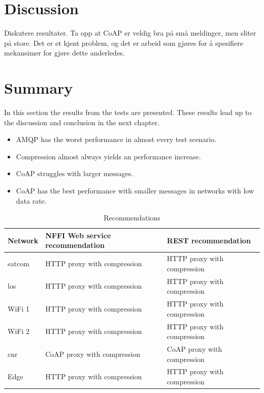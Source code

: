 \section{Discussion}

Diskutere resultater. Ta opp at CoAP er veldig bra på små meldinger, men sliter
på store. Det er et kjent problem, og det er arbeid som gjøres for å spesifiere
mekansimer for gjøre dette anderledes.

\section{Summary}

In this section the results from the tests are presented. These results lead up
to the discussion and conclusion in the next chapter.

\begin{itemize}
\item AMQP has the worst performance in almost every test scenario.
\item Compression almost always yields an performance increase.
\item CoAP struggles with larger messages.
\item CoAP has the best performance with smaller messages in networks with low data rate.
\end{itemize}

\begin{table}[h]
\begin{tabular}{| l | l | l |}
\hline
  \textbf{Network} & \textbf{NFFI Web service recommendation} & \textbf{REST recommendation}\\ \hline
  \gls{satcom} & HTTP proxy with compression & HTTP proxy with compression \\ \hline
  \gls{los} & HTTP proxy with compression  & HTTP proxy with compression \\ \hline
  WiFi 1 & HTTP proxy with compression & HTTP proxy with compression \\ \hline
  WiFi 2 & HTTP proxy with compression & HTTP proxy with compression \\ \hline
  \gls{cnr} & CoAP proxy with compression & CoAP proxy with compression \\ \hline
  Edge & HTTP proxy with compression & HTTP proxy with compression \\ \hline
\end{tabular}
\caption{Recommendations}
\label{table-evaluation-summary}
\end{table}
